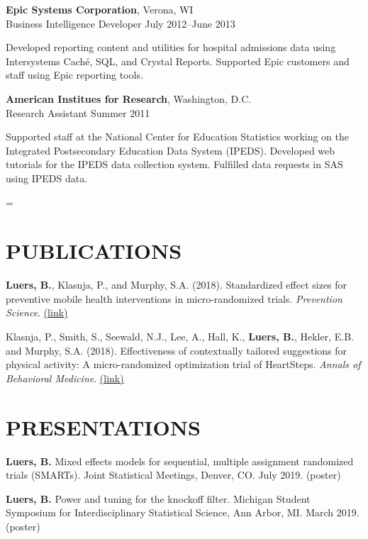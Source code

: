 \documentclass[letterpaper, 11pt]{article}
\newenvironment{absolutelynopagebreak}
  {\par\nobreak\vfil\penalty0\vfilneg
   \vtop\bgroup}
  {\par\xdef\tpd{\the\prevdepth}\egroup
   \prevdepth=\tpd}
\begin{document}
{\bf Epic Systems Corporation}, Verona, WI\\
Business Intelligence Developer \hfill July 2012--June 2013

{\addtolength{\leftskip}{15pt}
 Developed reporting content and utilities for hospital
  admissions data using Intersystems
  Cach\'{e}, SQL, and Crystal Reports.
 Supported Epic customers and
  staff using Epic reporting tools.

}

\begin{absolutelynopagebreak}
{\bf American Institues for Research}, Washington, D.C.\\
Research Assistant \hfill Summer 2011

{\addtolength{\leftskip}{15pt}
    Supported staff at the National Center for Education Statistics
   working on the Integrated Postsecondary Education Data System
   (IPEDS).
 Developed web tutorials for the IPEDS data collection
   system.
 Fulfilled data requests in SAS using IPEDS data.


}

\end{absolutelynopagebreak}

\section{PUBLICATIONS}

\textbf{Luers, B.}, Klasnja, P., and Murphy, S.A. (2018). Standardized effect sizes for preventive mobile health interventions in micro-randomized trials. \textit{Prevention Science}. \href{https://doi.org/10.1007/s11121-017-0862-5}{(link)}

Klasnja, P., Smith, S., Seewald, N.J., Lee, A., Hall, K., \textbf{Luers, B.}, Hekler, E.B. and Murphy, S.A. (2018). Effectiveness of contextually tailored suggestions for physical activity: A micro-randomized optimization trial of HeartSteps. \textit{Annals of Behavioral Medicine}. \href{https://doi.org/10.1093/abm/kay067}{(link)}

\section{PRESENTATIONS}

\textbf{Luers, B.} Mixed effects models for sequential, multiple assignment randomized trials (SMARTs).
Joint Statistical Meetings, Denver, CO. July 2019. (poster)

\textbf{Luers, B.} Power and tuning for the knockoff filter. 
Michigan Student Symposium for Interdisciplinary Statistical Science,
Ann Arbor, MI. March 2019. (poster)
\end{document}
